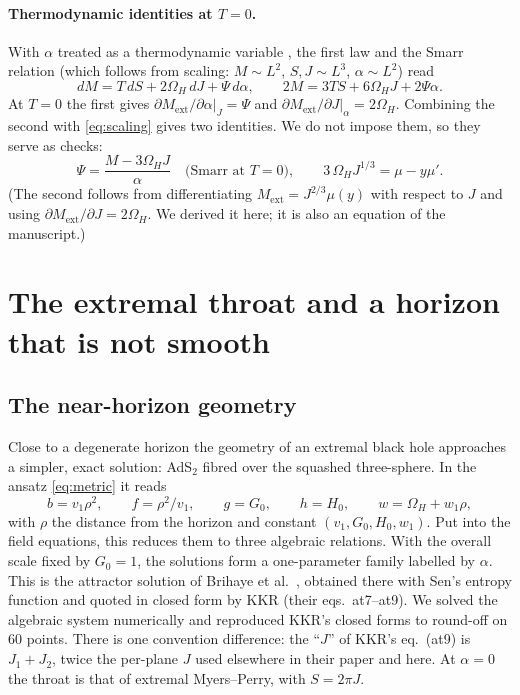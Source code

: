 \documentclass[11pt,a4paper]{article}
\newcommand{\ext}{\mathrm{ext}}
\begin{document}
\paragraph{Thermodynamic identities at $T=0$.} With $\alpha$ treated as a
thermodynamic variable \cite{KastorRayTraschen2010}, the first law and the
Smarr relation (which follows from scaling: $M\sim L^2$, $S,J\sim L^3$,
$\alpha\sim L^2$) read
\begin{equation}
  dM=T\,dS+2\Omega_H\,dJ+\Psi\,d\alpha,\qquad
  2M=3TS+6\Omega_HJ+2\Psi\alpha .
  \label{eq:firstlaw}
\end{equation}
At $T=0$ the first gives $\partial M_\ext/\partial\alpha|_J=\Psi$ and
$\partial M_\ext/\partial J|_\alpha=2\Omega_H$. Combining the second with
\eqref{eq:scaling} gives two identities. We do not impose them, so they serve as
checks:
\begin{equation}
  \Psi=\frac{M-3\Omega_HJ}{\alpha}\quad\text{(Smarr at $T=0$)},\qquad
  3\,\Omega_HJ^{1/3}=\mu-y\mu' .
  \label{eq:identities}
\end{equation}
(The second follows from differentiating $M_\ext=J^{2/3}\mu(y)$ with respect
to $J$ and using $\partial M_\ext/\partial J=2\Omega_H$. We derived it here; it is
also an equation of the manuscript.)

\section{The extremal throat and a horizon that is not smooth}
\label{sec:nh}

\subsection{The near-horizon geometry}

Close to a degenerate horizon the geometry of an extremal black hole approaches a
simpler, exact solution: AdS$_2$ fibred over the squashed three-sphere. In the
ansatz \eqref{eq:metric} it reads
\begin{equation}
  b=v_1\rho^2,\qquad f=\rho^2/v_1,\qquad g=G_0,\qquad h=H_0,\qquad w=\Omega_H+w_1\rho ,
  \label{eq:throat}
\end{equation}
with $\rho$ the distance from the horizon and constant $(v_1,G_0,H_0,w_1)$. Put
into the field equations, this reduces them to three algebraic relations. With
the overall scale fixed by $G_0=1$, the solutions form a one-parameter family
labelled by $\alpha$. This is the attractor solution of Brihaye et al.\
\cite{BKKR2010}, obtained there with Sen's entropy function \cite{Sen2007} and
quoted in closed form by KKR (their eqs.~at7--at9). We solved the algebraic
system numerically and reproduced KKR's closed forms to round-off on 60 points.
There is one convention difference: the ``$J$'' of KKR's eq.~(at9) is $J_1+J_2$,
twice the per-plane $J$ used elsewhere in their paper and here. At $\alpha=0$ the
throat is that of extremal Myers--Perry, with $S=2\pi J$.
\end{document}
